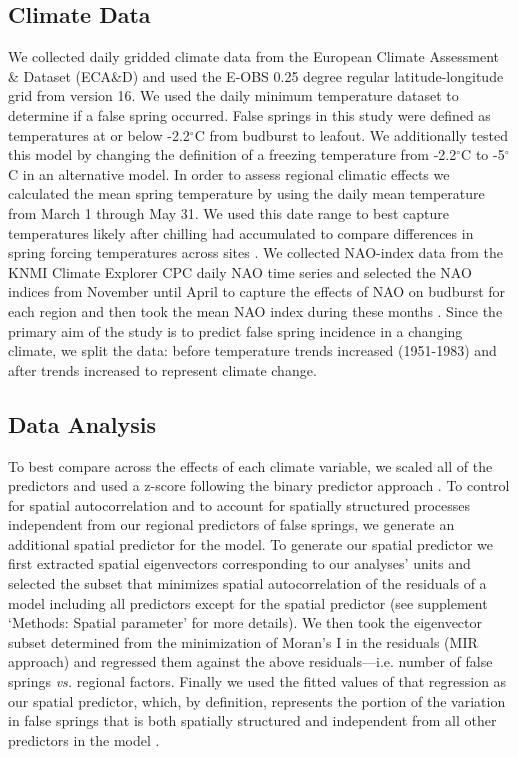 \documentclass{article}\usepackage[]{graphicx}\usepackage[]{color}
\begin{document}
\subsection*{Climate Data}
We collected daily gridded climate data from the European Climate Assessment \& Dataset (ECA\&D) and used the E-OBS 0.25 degree regular latitude-longitude grid from version 16. We used the daily minimum temperature dataset to determine if a false spring occurred. False springs in this study were defined as temperatures at or below -2.2$^{\circ}$C \citep{Schwartz1993} from budburst to leafout. We additionally tested this model by changing the definition of a freezing temperature from -2.2$^{\circ}$C \citep{Schwartz1993} to -5$^{\circ}$C \citep{Lenz2013, Sakai1987} in an alternative model. In order to assess regional climatic effects we calculated the mean spring temperature by using the daily mean temperature from March 1 through May 31. We used this date range to best capture temperatures likely after chilling had accumulated to compare differences in spring forcing temperatures across sites \citep{Basler2012, Korner2016}. We collected NAO-index data from the KNMI Climate Explorer CPC daily NAO time series and selected the NAO indices from November until April to capture the effects of NAO on budburst for each region and then took the mean NAO index during these months \citep{NAOdata}. Since the primary aim of the study is to predict false spring incidence in a changing climate, we split the data: before temperature trends increased (1951-1983) and after trends increased \citep[1984-2016,][]{Kharouba2018, Stocker2013} to represent climate change.

\subsection*{Data Analysis} 
To best compare across the effects of each climate variable, we scaled all of the predictors and used a z-score following the binary predictor approach \citep{Gelman2006}. To control for spatial autocorrelation and to account for spatially structured processes independent from our regional predictors of false springs, we generate an additional spatial predictor for the model. To generate our spatial predictor we first extracted spatial eigenvectors corresponding to our analyses' units and selected the subset that minimizes spatial autocorrelation of the residuals of a model including all predictors except for the spatial predictor \citep{diniz2012selection,Baumen2017} (see supplement `Methods: Spatial parameter' for more details). We then took the eigenvector subset determined from the minimization of Moran's I in the residuals (MIR approach) and regressed them against the above residuals---i.e. number of false springs \emph{vs.} regional factors. Finally we used the fitted values of that regression as our spatial predictor, which, by definition, represents the portion of the variation in false springs that is both spatially structured and independent from all other predictors in the model \citep[e.g. average spring temperature, elevation, etc.][]{griffith2006spatial,morales2012imprint}. 
\end{document}
